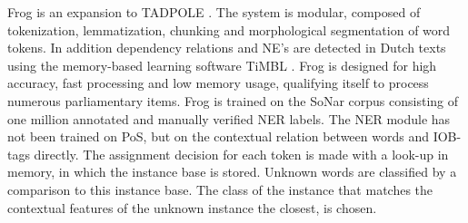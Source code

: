 Frog is an expansion to TADPOLE \cite{bosch2007efficient}. The system is modular, composed of tokenization, lemmatization, chunking and morphological segmentation of word tokens. In addition dependency relations and NE's are detected in Dutch texts using the memory-based learning software TiMBL \cite{daelemans2004timbl}. Frog is designed for high accuracy, fast processing and low memory usage, qualifying itself to process numerous parliamentary items. Frog is trained on the SoNar corpus consisting of one million annotated and manually verified NER labels. The NER module has not been trained on PoS, but on the contextual relation between words and IOB-tags directly.  The assignment decision for each token is made with a look-up in memory, in which the instance base is stored. Unknown words are classified by a comparison to this instance base. The class of the instance that matches the contextual features of the unknown instance the closest, is chosen.  




